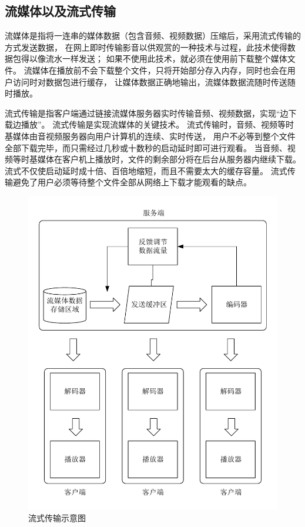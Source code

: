 \subsection{流媒体以及流式传输}
流媒体是指将一连串的媒体数据（包含音频、视频数据）压缩后，采用流式传输的方式发送数据，
在网上即时传输影音以供观赏的一种技术与过程，此技术使得数据包得以像流水一样发送；
如果不使用此技术，就必须在使用前下载整个媒体文件。
流媒体在播放前不会下载整个文件，只将开始部分存入内存，同时也会在用户访问时对数据包进行缓存，
让媒体数据正确地输出，流媒体数据流随时传送随时播放。

流式传输是指客户端通过链接流媒体服务器实时传输音频、视频数据，实现“边下载边播放”。
流式传输是实现流媒体的关键技术。
流式传输时，音频、视频等时基媒体由音视频服务器向用户计算机的连续、实时传送，
用户不必等到整个文件全部下载完毕，而只需经过几秒或十数秒的启动延时即可进行观看。
当音频、视频等时基媒体在客户机上播放时，文件的剩余部分将在后台从服务器内继续下载。
流式不仅使启动延时成十倍、百倍地缩短，而且不需要太大的缓存容量。
流式传输避免了用户必须等待整个文件全部从网络上下载才能观看的缺点。

\begin{figure}[ht]
    \centering
    \includegraphics[scale=1]{./Figure/IMG_server.pdf}
    \caption{流式传输示意图}
    \label{Fig:server}
\end{figure}

